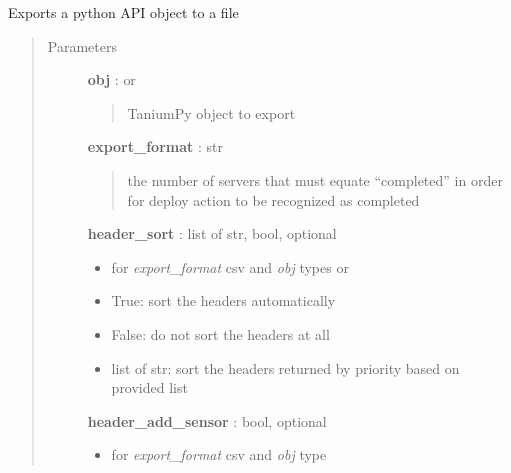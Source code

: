 \documentclass[letterpaper,10pt,english]{sphinxmanual}
\begin{document}
\begin{fulllineitems}
\label{pytan.handler:pytan.handler.Handler.export_to_report_file}
Exports a python API object to a file
\begin{quote}\begin{description}
\item[{Parameters}] \leavevmode
\textbf{obj} : {\hyperref[taniumpy.object_types:taniumpy.object_types.base.BaseType]{}} or {\hyperref[taniumpy.object_types:taniumpy.object_types.result_set.ResultSet]{}}
\begin{quote}

TaniumPy object to export
\end{quote}

\textbf{export\_format} : str
\begin{quote}

the number of servers that must equate ``completed'' in order for deploy action to be recognized as completed
\end{quote}

\textbf{header\_sort} : list of str, bool, optional
\begin{itemize}
\item {} 
for \emph{export\_format} csv and \emph{obj} types {\hyperref[taniumpy.object_types:taniumpy.object_types.base.BaseType]{}} or {\hyperref[taniumpy.object_types:taniumpy.object_types.result_set.ResultSet]{}}

\item {} 
True: sort the headers automatically

\item {} 
False: do not sort the headers at all

\item {} 
list of str: sort the headers returned by priority based on provided list

\end{itemize}

\textbf{header\_add\_sensor} : bool, optional
\begin{itemize}
\item {} 
for \emph{export\_format} csv and \emph{obj} type {\hyperref[taniumpy.object_types:taniumpy.object_types.result_set.ResultSet]{}}


\end{itemize}
\end{description}
\end{quote}
\end{fulllineitems}
\end{document}
